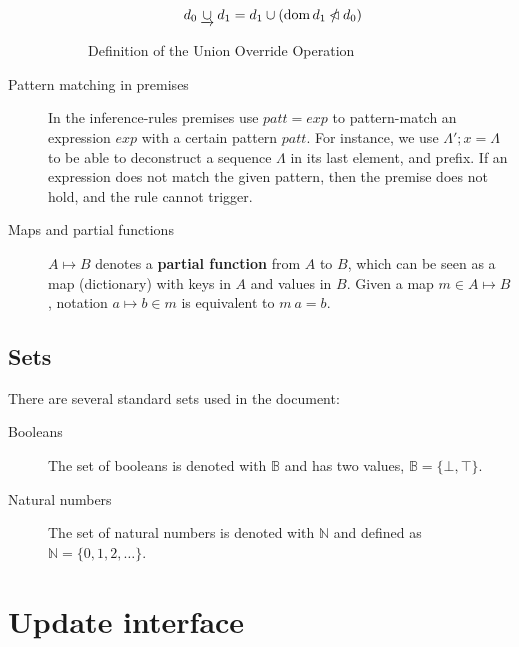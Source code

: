 \documentclass[11pt,a4paper]{article}
\DeclareMathOperator{\dom}{dom}
\newcommand{\restrictdom}{\lhd}
\newcommand{\subtractdom}{\mathbin{\slashed{\restrictdom}}}
\newcommand{\unionoverride}{\mathbin{\underrightarrow\cup}}
\newcommand{\var}[1]{\mathit{#1}}
\newcommand{\fun}[1]{\mathsf{#1}}
\newcommand{\type}[1]{\mathsf{#1}}
\begin{document}
\begin{description}
\begin{figure}
\begin{align*}
      & d_0 \unionoverride d_1 = d_1 \cup (\dom d_1 \subtractdom d_0)
    \end{align*}
    \caption{Definition of the Union Override Operation}
    \label{fig:unionoverride}
  \end{figure}
\item[Pattern matching in premises] In the inference-rules premises use
  $\var{patt} = \var{exp}$ to pattern-match an expression $\var{exp} $ with a
  certain pattern $\var{patt}$. For instance, we use $\Lambda'; x = \Lambda$ to
  be able to deconstruct a sequence $\Lambda$ in its last element, and prefix.
  If an expression does not match the given pattern, then the premise does not
  hold, and the rule cannot trigger.
\item[Maps and partial functions] $A \mapsto B$ denotes a \textbf{partial
    function} from $A$ to $B$, which can be seen as a map (dictionary) with
  keys in $A$ and values in $B$. Given a map $m \in A \mapsto B$, notation
  $a \mapsto b \in m$ is equivalent to $m~ a = b$.
\end{description}

\subsection{Sets}
\label{sec:sets}

There are several standard sets used in the document:
%
\begin{description}
\item[Booleans] The set of booleans is denoted with $\mathbb{B}$ and has two
  values, $\mathbb{B} = \{\bot, \top\}$.
\item[Natural numbers] The set of natural numbers is denoted with
  $\mathbb{N}$ and defined as $\mathbb{N} = \{0, 1, 2, \dots\}$.
\end{description}

\section{Update interface}

\newcommand{\bupdprop}[1]{\fun{bUpdProp}\ #1}
\newcommand{\bupdvotes}[1]{\fun{bUpdVotes}\ #1}
\newcommand{\bprotver}[1]{\fun{bProtVer}\ #1}
\newcommand{\bendorsment}[1]{\fun{bEndorsment}\ #1}

\newcommand{\UpdatePayload}{\type{UpdatePayload}}

\newcommand{\UPIEnv}{\type{UPIEnv}}
\newcommand{\UPIState}{\type{UPIState}}
\newcommand{\UProp}{\type{UProp}}
\newcommand{\Vote}{\ensuremath{\type{Vote}}}
\newcommand{\ProtVer}{\ensuremath{\type{ProtVer}}}
\end{document}
